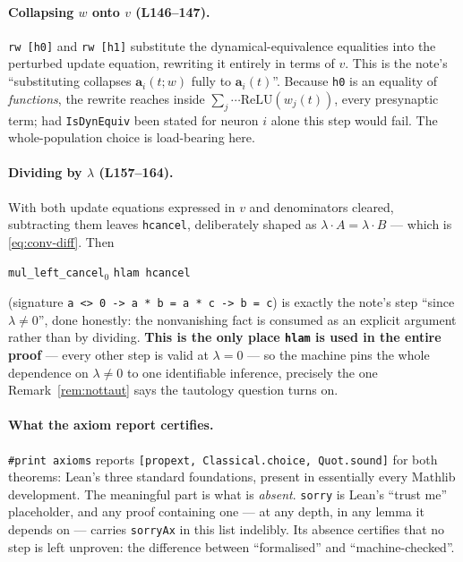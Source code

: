 \documentclass[11pt]{article}
\newcommand{\Mat}[1]{\mathbf{#1}}
\begin{document}
\paragraph{Collapsing $w$ onto $v$ (L146--147).} \texttt{rw [h0]} and
\texttt{rw [h1]} substitute the dynamical-equivalence equalities into the
perturbed update equation, rewriting it entirely in terms of $v$. This is
the note's ``substituting collapses $\Mat a_i(t;w)$ fully to $\Mat
a_i(t)$''. Because \texttt{h0} is an equality of \emph{functions}, the
rewrite reaches inside $\sum_j\cdots\mathrm{ReLU}(w_j(t))$, every
presynaptic term; had \texttt{IsDynEquiv} been stated for neuron $i$ alone
this step would fail. The whole-population choice is load-bearing here.

\paragraph{Dividing by $\lambda$ (L157--164).} With both update equations
expressed in $v$ and denominators cleared, subtracting them leaves
\texttt{hcancel}, deliberately shaped as $\lambda\cdot A=\lambda\cdot B$ ---
which is \eqref{eq:conv-diff}. Then
\begin{center}
\texttt{mul\_left\_cancel}$_0$ \texttt{hlam hcancel}
\end{center}
(signature \texttt{a <> 0 -> a * b = a * c -> b = c}) is exactly the note's
step ``since $\lambda\neq0$'', done honestly: the nonvanishing fact is
consumed as an explicit argument rather than by dividing. \textbf{This is
the only place \texttt{hlam} is used in the entire proof} --- every other
step is valid at $\lambda=0$ --- so the machine pins the whole dependence on
$\lambda\neq0$ to one identifiable inference, precisely the one
Remark~\ref{rem:nottaut} says the tautology question turns on.

\paragraph{What the axiom report certifies.} \texttt{\#print axioms} reports
\texttt{[propext, Classical.choice, Quot.sound]} for both theorems: Lean's
three standard foundations, present in essentially every Mathlib
development. The meaningful part is what is \emph{absent}. \texttt{sorry} is
Lean's ``trust me'' placeholder, and any proof containing one --- at any
depth, in any lemma it depends on --- carries \texttt{sorryAx} in this list
indelibly. Its absence certifies that no step is left unproven: the
difference between ``formalised'' and ``machine-checked''.
\end{document}
